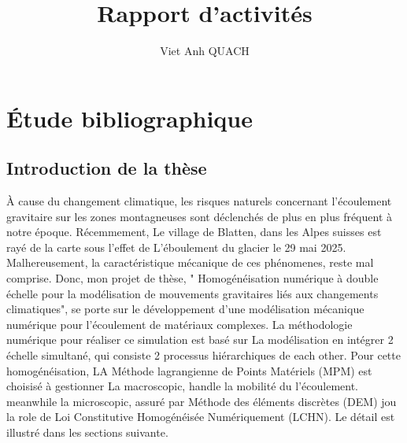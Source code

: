 \documentclass[a4paper,12pt]{report}
\title{Rapport d'activités}
\author{Viet Anh QUACH}
\begin{document}
\maketitle
\tableofcontents

\setcounter{secnumdepth}{4}

\chapter{Étude bibliographique}
\section{Introduction de la thèse}
À cause du changement climatique, les risques naturels concernant l'écoulement gravitaire sur les zones montagneuses sont déclenchés de plus en plus fréquent à notre époque. 
Récemmement, Le village de Blatten, dans les Alpes suisses est rayé de la carte sous l'effet de L’éboulement du glacier le 29 mai 2025. 
Malhereusement, la caractéristique mécanique de ces phénomenes, reste mal comprise. 
Donc, mon projet de thèse, " Homogénéisation numérique à double échelle pour la modélisation de mouvements gravitaires liés aux changements climatiques", se porte sur le développement d'une modélisation mécanique numérique pour l’écoulement de matériaux complexes. 
La méthodologie numérique pour réaliser ce simulation est basé sur La modélisation en intégrer 2 échelle simultané, qui consiste 2 processus hiérarchiques de each other. 
Pour cette homogénéisation, LA Méthode lagrangienne de Points Matériels (MPM) est choisisé à gestionner  La macroscopic, handle la mobilité du l'écoulement. 
meanwhile la microscopic, assuré par Méthode des éléments discrètes (DEM) jou la role de Loi Constitutive Homogénéisée Numériquement (LCHN). Le détail est illustré dans les sections suivante.
\end{document}
